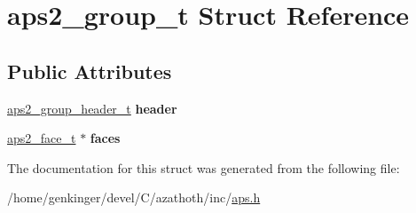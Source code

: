 \hypertarget{structaps2__group__t}{}\section{aps2\+\_\+group\+\_\+t Struct Reference}
\label{structaps2__group__t}
\subsection*{Public Attributes}
\begin{DoxyCompactItemize}
\item 
\mbox{\label{structaps2__group__t_aa063386a63fe03e81f3fb1ce1e520544}} 
\mbox{\hyperlink{structaps2__group__header__t}{aps2\+\_\+group\+\_\+header\+\_\+t}} {\bfseries header}
\item 
\mbox{\label{structaps2__group__t_a2c721a4fc6dacfacd61679fe918d43f6}} 
\mbox{\hyperlink{structaps2__face__t}{aps2\+\_\+face\+\_\+t}} $\ast$ {\bfseries faces}
\end{DoxyCompactItemize}


The documentation for this struct was generated from the following file\+:\begin{DoxyCompactItemize}
\item 
/home/genkinger/devel/\+C/azathoth/inc/\mbox{\hyperlink{aps_8h}{aps.\+h}}\end{DoxyCompactItemize}
